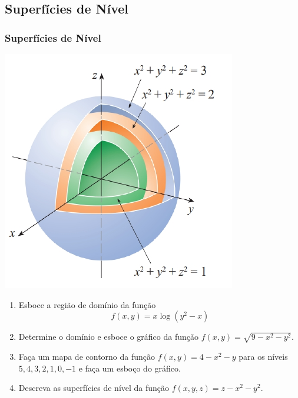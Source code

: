 \subsection*{Superfícies de Nível}
\begin{frame}[label=funcoes]
\frametitle{Superfícies de Nível}

\begin{center}
	\includegraphics[scale=0.5]{figuras/nivel-superfice.png}
\end{center}

\end{frame}


\begin{frame}[label=funcoes]
\begin{casa}
\begin{enumerate}
\item Esboce a região de domínio da função 
\[f(x,y)=x\log(y^2-x)\]
\item Determine o domínio e esboce o gráfico da função  $f(x,y)=\sqrt{9-x^2-y^2}$.

\item Faça um mapa de contorno da função $f(x,y)=4-x^2-y$ para os níveis $5,4,3,2,1,0,-1$ e faça um esboço do gráfico.

\item Descreva as superfícies de nível da função $f(x,y,z)=z-x^2-y^2$.
\end{enumerate}
\end{casa}
\end{frame}
